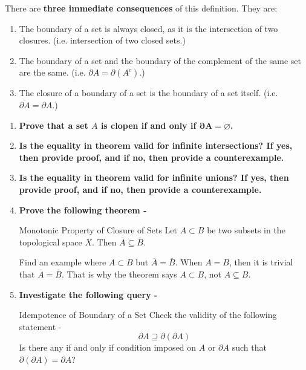 \noindent There are \textbf{three immediate consequences} of this definition. They are:
\begin{enumerate}
    \item The boundary of a set is always closed, as it is the intersection of two closures. (i.e. intersection of two closed sets.)
    \item The boundary of a set and the boundary of the complement of the same set are the same. (i.e. $\partial A=\partial (A^c)$.)
    \item The closure of a boundary of a set is the boundary of a set itself. (i.e. $\overline{\partial A}=\partial A$.)
\end{enumerate}
\exercise
\begin{enumerate}[label=\textbf{\arabic*}.]
    \item \textbf{Prove that a set $A$ is clopen if and only if $\pmb{\partial A=\varnothing}$.}
    \item \textbf{Is the equality in theorem \pmb{\eqref{intersection_interior}} valid for infinite intersections? If yes, then provide proof, and if no, then provide a counterexample.}
    \item \textbf{Is the equality in theorem \pmb{\eqref{closure_union}} valid for infinite unions? If yes, then provide proof, and if no, then provide a counterexample.}
    \item \textbf{Prove the following theorem -}
    \begin{Theorem}{Monotonic Property of Closure of Sets}\label{monotonicity_of_closure}
        Let $A\subset B$ be two subsets in the topological space $X$. Then $\overline{A}\subseteq\overline{B}$.
    \end{Theorem}
    \noindent Find an example where $A\subset B$ but $\overline{A}=\overline{B}$. When $A=B$, then it is trivial that $\overline{A}=\overline{B}$. That is why the theorem says $A\subset B$, not $A\subseteq B$.
    \item \textbf{Investigate the following query -}
    \begin{Query}{Idempotence of Boundary of a Set}\label{idempotence_of_boundary}
        Check the validity of the following statement - $$\partial A\supseteq\partial(\partial A)$$
        Is there any if and only if condition imposed on $A$ or $\partial A$ such that $\partial(\partial A)=\partial A$?\newline
        [Hint: From the 3rd consequence of the alternate definition of the boundary of a set, recall that $\overline{\partial A}=\partial A$. From here on, I believe you should be able to do the rest.]
    \end{Query}
\end{enumerate}
